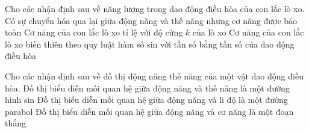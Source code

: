 \begin{ex}
Cho các nhận định sau về năng lượng trong dao động điều hòa của con lắc lò xo.
{\True Có sự chuyển hóa qua lại giữa động năng và thế năng nhưng cơ năng được bảo toàn}
{\True Cơ năng của con lắc lò xo tỉ lệ với độ cứng $k$ của lò xo}
{Cơ năng của con lắc lò xo biến thiên theo quy luật hàm số sin với tần số bằng tần số của dao động điều hòa}
\loigiai{
\begin{itemchoice}
\itemch
\itemch
\itemch
\itemch
\end{itemchoice}

}
\end{ex} 

\begin{ex}
Cho các nhận định sau về đồ thị động năng thế năng của một vật dao động điều hòa.
{Đồ thị biểu diễn mối quan hệ giữa động năng và thế năng là một đường hình sin}
{\True Đồ thị biểu diễn mối quan hệ giữa động năng và li độ là một đường parabol}
{\True Đồ thị biểu diễn mối quan hệ giữa động năng và cơ năng là một đoạn thẳng}
\loigiai{
\begin{itemchoice}
\itemch
\itemch
\itemch
\itemch
\end{itemchoice}

}
\end{ex} 


